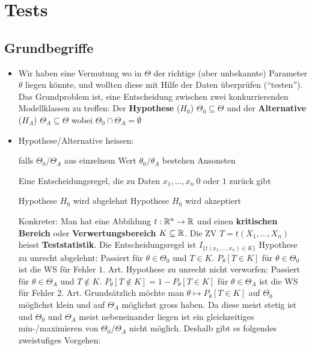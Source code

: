 
\section{Tests}
\subsection{Grundbegriffe}
\begin{itemize}
    \item Wir haben eine Vermutung wo in $\Theta$ der richtige (aber unbekannte) Parameter $\theta$ liegen könnte, und wollten diese mit Hilfe der Daten überprüfen (``testen''). Das Grundproblem ist, eine Entscheidung zwischen zwei konkurrierenden Modellklassen zu treffen: Der \textbf{Hypothese} ($H_0$) $\Theta_0 \subseteq \Theta$ und der \textbf{Alternative} ($H_A$) $\Theta_A \subseteq \Theta$ wobei $\Theta_0 \cap \Theta_A = \emptyset$
    \item Hypothese/Alternative heissen:
        \begin{itemize}
             falls $\Theta_0/\Theta_A$ aus einzelnem Wert $\theta_0/\theta_A$ bestehen
             Ansonsten
        \end{itemize}
     Eine Entscheidungsregel, die zu Daten $x_1, \dots, x_n \ 0$ oder $1$ zurück gibt
        \begin{itemize}
             Hypothese $H_0$ wird abgelehnt
             Hypothese $H_0$ wird akzeptiert
        \end{itemize}
        Konkreter: Man hat eine Abbildung $t: \mathbb{R}^n \to \mathbb{R}$ und einen \textbf{kritischen Bereich} oder \textbf{Verwertungsbereich} $K \subseteq \mathbb{R}$. Die ZV $T = t(X_1, \dots, X_n)$ heisst \textbf{Teststatistik}. Die Entscheidungsregel ist $I_{\{t(x_1, \dots, x_n) \in K\}}$
         Hypothese zu unrecht abgelehnt: Passiert für $\theta \in \Theta_0$ und $T \in K$. $P_\theta[T \in K]$ für $\theta \in \Theta_0$ ist die WS für Fehler $1.$ Art.
         Hypothese zu unrecht nicht verworfen: Passiert für $\theta \in \Theta_A$ und $T \notin K$. $P_\theta[T \notin K] = 1 - P_\theta[T \in K]$ für $\theta \in \Theta_A$ ist die WS für Fehler $2.$ Art.
     Grundsätzlich möchte man $\theta \mapsto P_\theta[T \in K]$ auf $\Theta_0$ möglichst klein und auf $\Theta_A$ möglichst gross haben. Da diese meist stetig ist und $\Theta_0$ und $\Theta_A$ meist nebeneinander liegen ist ein gleichzeitiges min-/maximieren von $\Theta_0/\Theta_A$ nicht möglich. Deshalb gibt es folgendes zweistufiges Vorgehen:

\end{itemize}
